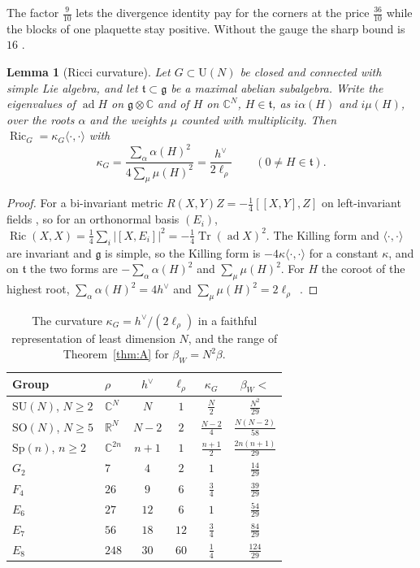 \documentclass[11pt]{amsart}
\newtheorem{lemma}[theorem]{Lemma}
\theoremstyle{definition}
\theoremstyle{remark}
\numberwithin{equation}{section}
\newcommand{\R}{\mathbb{R}}
\newcommand{\C}{\mathbb{C}}
\newcommand{\SU}{\mathrm{SU}}
\newcommand{\SO}{\mathrm{SO}}
\newcommand{\U}{\mathrm{U}}
\newcommand{\g}{\mathfrak{g}}
\newcommand{\Tr}{\operatorname{Tr}}
\newcommand{\Ric}{\operatorname{Ric}}
\newcommand{\ip}[2]{\langle #1,#2\rangle}
\begin{document}
The factor $\frac9{10}$ lets the divergence identity pay for the corners at
the price $\frac{36}{10}$ while the blocks of one plaquette stay positive.
Without the gauge the sharp bound is $16$ \cite{BB26a}.

\begin{lemma}[Ricci curvature]\label{lem:ricci}
Let $G\subset\U(N)$ be closed and connected with simple Lie algebra, and let
$\mathfrak t\subset\g$ be a maximal abelian subalgebra. Write the eigenvalues
of $\operatorname{ad}H$ on $\g\otimes\C$ and of $H$ on $\C^N$, $H\in\mathfrak t$, as
$i\alpha(H)$ and $i\mu(H)$, over the roots $\alpha$ and the weights $\mu$ counted
with multiplicity. Then $\Ric_G=\kappa_G\ip\cdot\cdot$ with
\[
\kappa_G=\frac{\sum_\alpha\alpha(H)^2}{4\sum_\mu\mu(H)^2}=\frac{h^\vee}{2\ell_\rho}
\qquad(0\ne H\in\mathfrak t).
\]
\end{lemma}

\begin{proof}
For a bi-invariant metric $R(X,Y)Z=-\frac14[[X,Y],Z]$ on left-invariant fields
\cite[Sect.~7]{Mil76}, so for an orthonormal basis $(E_i)$,
$\Ric(X,X)=\frac14\sum_i|[X,E_i]|^2=-\frac14\Tr(\operatorname{ad}X)^2$. The
Killing form and $\ip\cdot\cdot$ are invariant and $\g$ is simple, so the
Killing form is $-4\kappa\ip\cdot\cdot$ for a constant $\kappa$, and on
$\mathfrak t$ the two forms are $-\sum_\alpha\alpha(H)^2$ and $\sum_\mu\mu(H)^2$.
For $H$ the coroot of the highest root, $\sum_\alpha\alpha(H)^2=4h^\vee$ and
$\sum_\mu\mu(H)^2=2\ell_\rho$~\cite[Ch.~6]{Kac90}.
\end{proof}

\begin{table}[t]
\caption{The curvature $\kappa_G=h^\vee/(2\ell_\rho)$ in a faithful
representation of least dimension $N$, and the range of Theorem~\ref{thm:A}
for $\beta_W=N^2\beta$.}
\label{tab:groups}
\begin{tabular}{llcccc}
\toprule
Group&$\rho$&$h^\vee$&$\ell_\rho$&$\kappa_G$&$\beta_W<$\\
\midrule
$\SU(N)$, $N\ge2$&$\C^N$&$N$&$1$&$\frac N2$&$\frac{N^2}{29}$\\
$\SO(N)$, $N\ge5$&$\R^N$&$N-2$&$2$&$\frac{N-2}4$&$\frac{N(N-2)}{58}$\\
$\mathrm{Sp}(n)$, $n\ge2$&$\C^{2n}$&$n+1$&$1$&$\frac{n+1}2$&$\frac{2n(n+1)}{29}$\\
$G_2$&$7$&$4$&$2$&$1$&$\frac{14}{29}$\\
$F_4$&$26$&$9$&$6$&$\frac34$&$\frac{39}{29}$\\
$E_6$&$27$&$12$&$6$&$1$&$\frac{54}{29}$\\
$E_7$&$56$&$18$&$12$&$\frac34$&$\frac{84}{29}$\\
$E_8$&$248$&$30$&$60$&$\frac14$&$\frac{124}{29}$\\
\bottomrule
\end{tabular}
\end{table}
\end{document}
